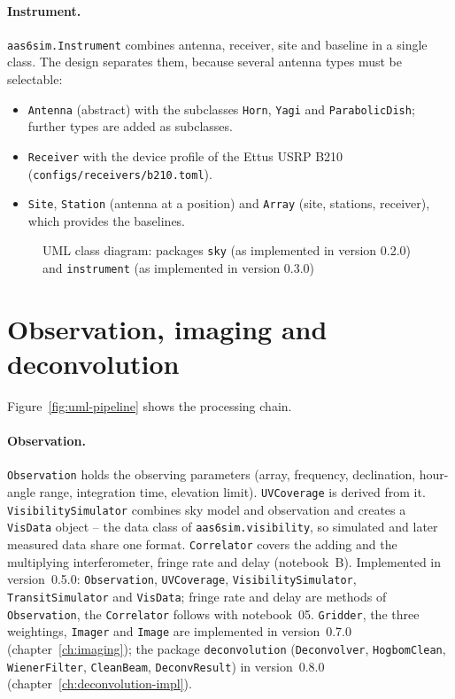 \paragraph*{Instrument.} \texttt{aas6sim.Instrument} combines antenna,
receiver, site and baseline in a single class. The design separates
them, because several antenna types must be selectable:
\begin{itemize}
  \item \texttt{Antenna} (abstract) with the subclasses \texttt{Horn}, \texttt{Yagi}
        and \texttt{ParabolicDish}; further types are added as
        subclasses.
  \item \texttt{Receiver} with the device profile of the Ettus USRP B210
        (\texttt{configs/receivers/b210.toml}).
  \item \texttt{Site}, \texttt{Station} (antenna at a position) and
        \texttt{Array} (site, stations, receiver), which provides the
        baselines.
\end{itemize}

\begin{figure}[htbp]
  \centering
  \resizebox{\textwidth}{!}{}
  \caption{UML class diagram: packages \texttt{sky} (as implemented in
           version 0.2.0) and \texttt{instrument} (as implemented in version 0.3.0)}
  \label{fig:uml-model}
\end{figure}

\section{Observation, imaging and deconvolution}

Figure~\ref{fig:uml-pipeline} shows the processing chain.

\paragraph*{Observation.} \texttt{Observation} holds the observing
parameters (array, frequency, declination, hour-angle range,
integration time, elevation limit). \texttt{UVCoverage} is derived from
it. \texttt{VisibilitySimulator} combines sky model and observation and
creates a \texttt{VisData} object -- the data class of
\texttt{aas6sim.visibility}, so simulated and later measured data share
one format. \texttt{Correlator} covers the adding and the multiplying
interferometer, fringe rate and delay (notebook~B). Implemented in
version~0.5.0: \texttt{Observation}, \texttt{UVCoverage},
\texttt{VisibilitySimulator}, \texttt{TransitSimulator} and
\texttt{VisData}; fringe rate and delay are methods of
\texttt{Observation}, the \texttt{Correlator} follows with notebook~05.
\texttt{Gridder}, the three weightings, \texttt{Imager} and \texttt{Image}
are implemented in version~0.7.0 (chapter~\ref{ch:imaging}); the package
\texttt{deconvolution} (\texttt{Deconvolver}, \texttt{HogbomClean},
\texttt{WienerFilter}, \texttt{CleanBeam}, \texttt{DeconvResult}) in
version~0.8.0 (chapter~\ref{ch:deconvolution-impl}).

